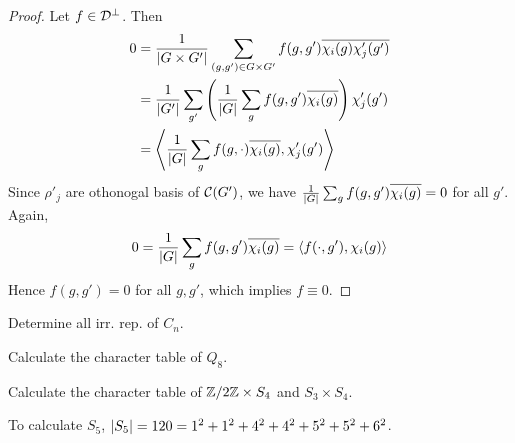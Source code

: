 \begin{theorem}
\begin{proof}
  Let $f \in \mathcal{D}^\perp$. Then
  \begin{align*}
    0 &= \frac{1}{\lvert G\times G'\rvert} \sum_{(g,g')\in G\times G'}
    f(g,g')\overline{\chi_i(g)\chi_j'(g')} \\
    &= \frac{1}{\lvert G'\rvert} \sum_{g'} \left( \frac{1}{\lvert G\rvert}\sum_g f(g, g') \overline{\chi_i(g)} \right) \chi'_j(g') \\
    &= \left\langle \frac{1}{\lvert G\rvert} \sum_g f(g, \cdot) \overline{\chi_i(g)}, \chi'_j(g') \right\rangle
  \end{align*}
  Since $\rho'_j$ are othonogal basis of $\mathcal{C}(G')$, we have $\frac{1}{\lvert G\rvert} \sum_g f(g, g') \overline{\chi_i(g)}
  = 0$ for all $g'$.
  Again, 
  \[ 0 = \frac{1}{\lvert G\rvert} \sum_g f(g, g') \overline{\chi_i(g)} = \langle f(\cdot, g'), \chi_i(g)\rangle \]
  Hence $f(g, g') = 0$ for all $g, g'$, which implies $f \equiv 0$.
\end{proof}

\end{theorem}

\begin{exercise}
  Determine all irr. rep. of $C_n$.
\end{exercise}

\begin{exercise}
  Calculate the character table of $Q_8$.
\end{exercise}

\begin{exercise}
  Calculate the character table of ${\mathbb{Z}}/{2\mathbb{Z}}\times S_4$ and
  $S_3\times S_4$.
\end{exercise}

To calculate $S_5$, $\lvert S_5\rvert = 120 = 1^2 + 1^2 + 4^2 + 4^2 + 5^2 + 5^2 + 6^2$.
